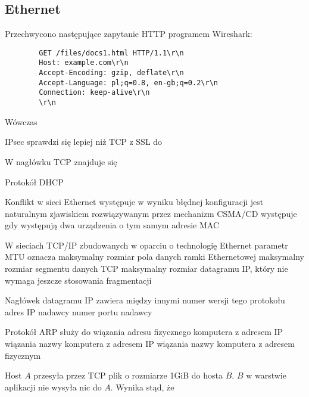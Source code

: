 \subsection{Ethernet}


\begin{problems}
    \prob Przechwycono następujące zapytanie HTTP programem Wireshark:
    \begin{verbatim}
        GET /files/docs1.html HTTP/1.1\r\n
        Host: example.com\r\n
        Accept-Encoding: gzip, deflate\r\n
        Accept-Language: pl;q=0.8, en-gb;q=0.2\r\n
        Connection: keep-alive\r\n
        \r\n
    \end{verbatim}
    Wówczas
    
    \prob IPsec sprawdzi się lepiej niż TCP z SSL do

    \prob W nagłówku TCP znajduje się

    \prob Protokół DHCP

    \prob Konflikt w sieci Ethernet
    \answers
    {występuje w wyniku błędnej konfiguracji}
    {jest naturalnym zjawiskiem rozwiązywanym przez mechanizm CSMA/CD}
    {występuje gdy występują dwa urządzenia o tym samym adresie MAC}

    \prob W sieciach TCP/IP zbudowanych w oparciu o technologię Ethernet parametr MTU oznacza
    \answers
    {maksymalny rozmiar pola danych ramki Ethernetowej}
    {maksymalny rozmiar segmentu danych TCP}
    {maksymalny rozmiar datagramu IP, który nie wymaga jeszcze stosowania fragmentacji}
  

    \prob Nagłówek datagramu IP zawiera między innymi
    \answers
    {numer wersji tego protokołu}
    {adres IP nadawcy}
    {numer portu nadawcy}

    \prob Protokół ARP służy do
    \answers
    {wiązania adresu fizycznego komputera z adresem IP}
    {wiązania nazwy komputera z adresem IP}
    {wiązania nazwy komputera z adresem fizycznym}

    \prob Host $A$ przesyła przez TCP plik o rozmiarze 1GiB do hosta $B$. $B$ w warstwie aplikacji nie wysyła nic do $A$. Wynika stąd, że
\end{problems}

